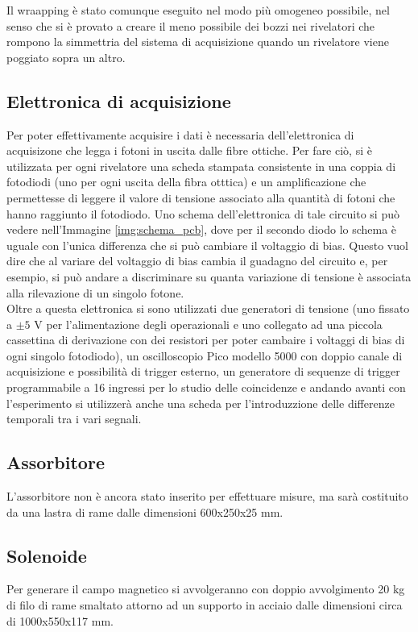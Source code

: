 Il wraapping è stato comunque eseguito nel modo più omogeneo possibile, nel senso che si è provato a creare il meno possibile dei bozzi nei rivelatori che rompono
la simmettria del sistema di acquisizione quando un rivelatore viene poggiato sopra un altro.

\subsection{Elettronica di acquisizione}
Per poter effettivamente acquisire i dati è necessaria dell'elettronica di acquisizone che legga i fotoni in uscita dalle fibre ottiche. Per fare ciò, si è utilizzata per
ogni rivelatore una scheda stampata consistente in una coppia di fotodiodi (uno per ogni uscita della fibra otttica) e un amplificazione che permettesse di
leggere il valore di tensione associato alla quantità di fotoni che hanno raggiunto il fotodiodo. Uno schema dell'elettronica di tale circuito si può vedere nell'Immagine
\ref{img:schema_pcb}, dove per il secondo diodo lo schema è uguale con l'unica differenza che si può cambiare il voltaggio di bias. Questo vuol dire che al variare del
voltaggio di bias cambia il guadagno del circuito e, per esempio, si può andare a discriminare su quanta variazione di tensione è associata alla rilevazione di un singolo
fotone.\\

Oltre a questa elettronica si sono utilizzati due generatori di tensione (uno fissato a $\pm 5$ V per l'alimentazione degli operazionali e uno collegato ad una piccola
cassettina di derivazione con dei resistori per poter cambaire i voltaggi di bias di ogni singolo fotodiodo), un oscilloscopio Pico modello 5000 con doppio canale di
acquisizione e possibilità di trigger esterno, un generatore di sequenze di trigger programmabile a 16 ingressi per lo studio delle coincidenze e andando avanti
con l'esperimento si utilizzerà anche una scheda per l'introduzzione delle differenze temporali tra i vari segnali.

\subsection{Assorbitore}
L'assorbitore non è ancora stato inserito per effettuare misure, ma sarà costituito da una lastra di rame dalle dimensioni 600x250x25 mm.

\subsection{Solenoide}
Per generare il campo magnetico si avvolgeranno con doppio avvolgimento 20 kg di filo di rame smaltato attorno ad un supporto in acciaio dalle dimensioni circa
di 1000x550x117 mm.